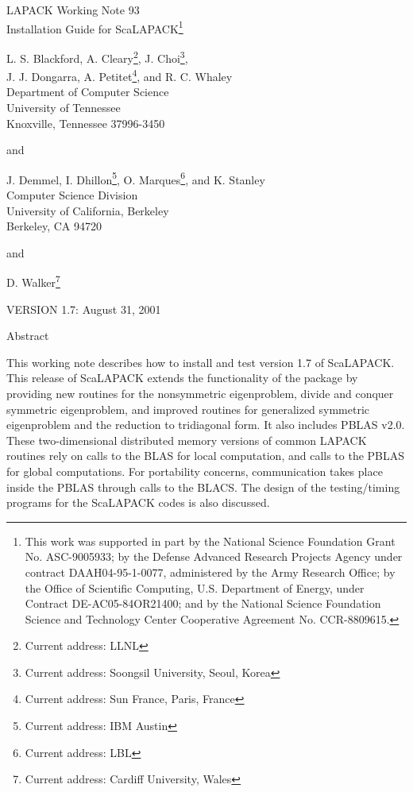 \documentclass[11pt]{report}
\begin{document}
\begin{center}
  {\Large LAPACK Working Note 93\\
  Installation Guide for ScaLAPACK\footnote{This work was supported
in part by the National Science Foundation Grant No. ASC-9005933; by
the Defense Advanced Research Projects Agency under contract
DAAH04-95-1-0077, administered by the Army Research Office;
by the Office of Scientific Computing,
U.S. Department of Energy, under Contract
DE-AC05-84OR21400; and
by the National Science
Foundation Science and Technology Center Cooperative
Agreement No. CCR-8809615.}}
\end{center}
\begin{center}
L. S. Blackford, A. Cleary\footnote{Current address:  LLNL}, J. Choi\footnote{Current address: Soongsil University, Seoul,
Korea}, \\
J. J. Dongarra, A. Petitet\footnote{Current address: Sun France, Paris, France}, and R. C. Whaley\\
Department of Computer Science \\
University of Tennessee \\
Knoxville, Tennessee  37996-3450 \\
\end{center}
\begin{center}
and
\end{center}
\begin{center}
J. Demmel, I. Dhillon\footnote{Current address: IBM Austin}, O. Marques\footnote{Current address:  LBL}, and K. Stanley \\
   Computer Science Division \\
   University of California, Berkeley \\
   Berkeley, CA 94720 \\
\end{center}
\begin{center}
and
\end{center}
\begin{center}
D. Walker\footnote{Current address:  Cardiff University, Wales} \\
\end{center}
\begin{center}
  VERSION 1.7:  August 31, 2001
\end{center}

\begin{center}
Abstract
\end{center}
This working note describes how to install and test
version 1.7 of ScaLAPACK.
This release of ScaLAPACK extends the
functionality of the package by providing new routines for
the nonsymmetric eigenproblem, divide and conquer symmetric eigenproblem,
and improved routines for generalized symmetric eigenproblem and
the reduction to tridiagonal form.
It also includes PBLAS v2.0.
These two-dimensional
distributed memory versions of common LAPACK routines
rely on calls
to the BLAS for local computation, and calls to the
PBLAS for global
computations.  For portability concerns, communication takes place inside
the PBLAS through calls to the BLACS.
The design of the testing/timing
programs for the ScaLAPACK codes is also discussed. 
\end{document}
